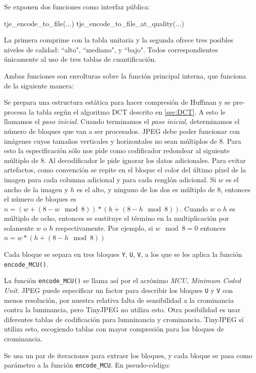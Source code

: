 Se exponen dos funciones como interfaz pública:

\begin{code}[language=C][h]
tje_encode_to_file(...)
tje_encode_to_file_at_quality(...)
\end{code}

La primera comprime con la tabla unitaria y la segunda ofrece tres posibles
niveles de calidad: ``alto", ``mediano", y ``bajo". Todos correspondientes
únicamente al uso de tres tablas de cuantificación.

Ambas funciones son envolturas sobre la función principal interna, que funciona
de la siguiente manera:

Se prepara una estructura estática para hacer compresión de Huffman y se
pre-procesa la tabla según el algoritmo DCT descrito en \ref{sec:DCT}. A esto
le llamamos el \emph{paso inicial}.  Cuando terminamos el \emph{paso inicial},
determinamos el número de bloques que van a ser procesados. JPEG debe poder
funcionar con imágenes cuyos tamaños verticales y horizontales no sean múltiplos
de 8. Para esto la especificación sólo nos pide como codificador redondear al
siguiente múltiplo de 8. Al decodificador le pide ignorar los datos adicionales. Para
evitar \gls{artefactos}, como convención se repite en el bloque el color del
último píxel de la imagen para cada columna adicional y para cada renglón adicional. Si
$w$ es el ancho de la imagen y $h$ es el alto, y ninguno de los dos es múltiplo
de 8, entonces el número de bloques es $n = (w + (8 - w \mod 8)) * (h + (8 - h
\mod 8))$. Cuando $w$ o $h$ es múltiplo de ocho, entonces se sustituye el
término en la multiplicación por solamente $w$ o $h$ respectivamente. Por
ejemplo, si $w \mod 8 = 0$ entonces $n = w * (h + (8 - h \mod 8))$

Cada bloque se separa en tres bloques \verb+Y+, \verb+U+, \verb+V+, a los que
se les aplica la función \verb+encode_MCU()+.

La función \verb+encode_MCU()+ se llama así por el acrónimo \emph{\gls{MCU}},
\emph{Minimum Coded Unit}. JPEG puede especificar un factor para describir los
bloques \verb+U+ y \verb+V+ con menos resolución, por nuestra relativa falta de
sensibilidad a la crominancia contra la luminancia, pero TinyJPEG no utiliza
esto. Otra posibilidad es usar diferentes tablas de codificación para
lumninancia y crominancia. TinyJPEG sí utiliza esto, escogiendo tablas con
mayor compresión para los bloques de crominancia.

Se usa un par de iteraciones para extraer los bloques, y cada bloque se pasa como
parámetro a la función \verb+encode_MCU+. En pseudo-código:

